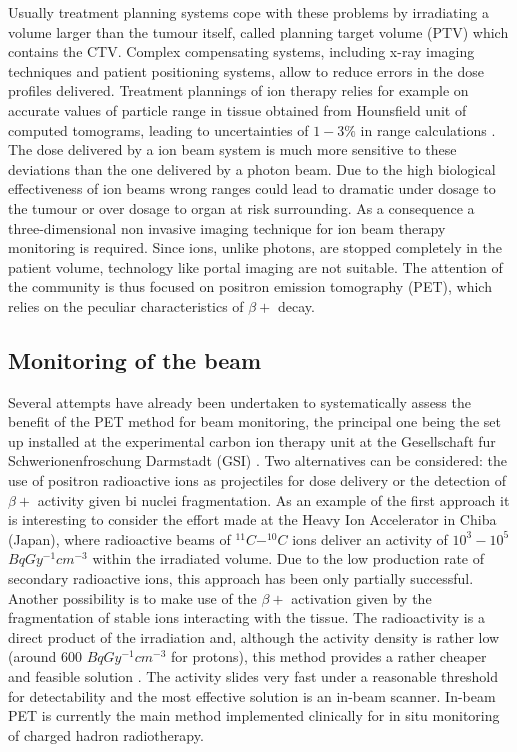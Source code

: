 Usually treatment planning systems cope with these problems by irradiating a volume larger than the tumour itself, called planning target volume (PTV) which contains the CTV. Complex compensating systems, including x-ray imaging techniques and patient positioning systems, allow to reduce errors in the dose profiles delivered. Treatment plannings of ion therapy relies for example on accurate values of particle range in tissue obtained from Hounsfield unit of computed tomograms, leading to uncertainties of $1-3\%$ in range calculations \cite{Enghardt2004}.
The dose delivered by a ion beam system is much more sensitive to these deviations than the one delivered by a photon beam. Due to the high biological effectiveness of ion beams wrong ranges could lead to dramatic under dosage to the tumour or over dosage to organ at risk surrounding.
As a consequence a three-dimensional non invasive imaging technique for ion beam therapy monitoring is required. Since ions, unlike photons, are stopped completely in the patient volume, technology like portal imaging are not suitable. The attention of the community is thus focused on positron emission tomography (PET), which relies on the peculiar characteristics of $\beta +$ decay.

\subsection{Monitoring of the beam}

Several attempts have already been undertaken to systematically assess the benefit of the PET method for beam monitoring, the principal one being the set up installed at the experimental carbon ion therapy unit at the Gesellschaft fur Schwerionenfroschung Darmstadt (GSI) \cite{Parodi2004}.
Two alternatives can be considered: the use of positron radioactive ions as projectiles for dose delivery or the detection of $\beta +$ activity given bi nuclei fragmentation.
As an example of the first approach it is interesting to consider the effort made at the Heavy Ion Accelerator in Chiba (Japan), where radioactive beams of $^{11}C - ^{10}C$ ions deliver an activity of $10^{3} - 10^{5}$ $Bq Gy^{-1} cm^{-3}$ within the irradiated volume.
Due to the low production rate of secondary radioactive ions, this approach has been only partially successful.
Another possibility is to make use of the $\beta +$ activation given by the fragmentation of stable ions interacting with the tissue.
The radioactivity is a direct product of the irradiation and, although the activity density is rather low (around 600 $Bq Gy^{-1} cm^{-3}$ for protons), this method provides a rather cheaper and feasible solution \cite{Enghardt2004}.
The activity slides very fast under a reasonable threshold for detectability and the most effective solution is an in-beam scanner.
In-beam PET is currently the main method implemented clinically for in situ monitoring of charged hadron radiotherapy\cite{Crespo2007}.

